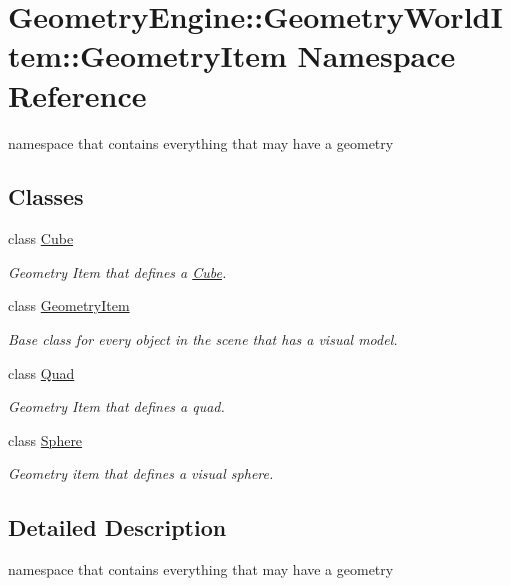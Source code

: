 \hypertarget{namespace_geometry_engine_1_1_geometry_world_item_1_1_geometry_item}{}\section{Geometry\+Engine\+::Geometry\+World\+Item\+::Geometry\+Item Namespace Reference}
\label{namespace_geometry_engine_1_1_geometry_world_item_1_1_geometry_item}


namespace that contains everything that may have a geometry  


\subsection*{Classes}
\begin{DoxyCompactItemize}
\item 
class \mbox{\hyperlink{class_geometry_engine_1_1_geometry_world_item_1_1_geometry_item_1_1_cube}{Cube}}
\begin{DoxyCompactList}\small\item\em Geometry Item that defines a \mbox{\hyperlink{class_geometry_engine_1_1_geometry_world_item_1_1_geometry_item_1_1_cube}{Cube}}. \end{DoxyCompactList}\item 
class \mbox{\hyperlink{class_geometry_engine_1_1_geometry_world_item_1_1_geometry_item_1_1_geometry_item}{Geometry\+Item}}
\begin{DoxyCompactList}\small\item\em Base class for every object in the scene that has a visual model. \end{DoxyCompactList}\item 
class \mbox{\hyperlink{class_geometry_engine_1_1_geometry_world_item_1_1_geometry_item_1_1_quad}{Quad}}
\begin{DoxyCompactList}\small\item\em Geometry Item that defines a quad. \end{DoxyCompactList}\item 
class \mbox{\hyperlink{class_geometry_engine_1_1_geometry_world_item_1_1_geometry_item_1_1_sphere}{Sphere}}
\begin{DoxyCompactList}\small\item\em Geometry item that defines a visual sphere. \end{DoxyCompactList}\end{DoxyCompactItemize}


\subsection{Detailed Description}
namespace that contains everything that may have a geometry 
